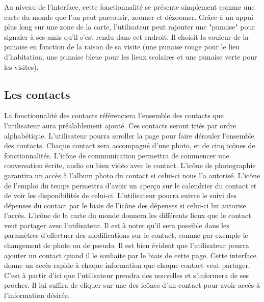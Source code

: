 \documentclass[11pt]{article}
\begin{document}
Au niveau de l'interface, cette fonctionnalité se présente simplement comme une carte du monde que l'on peut parcourir, zoomer et dézoomer. Grâce à un appui plus long sur une zone de la carte, l'utilisateur peut rajouter une "punaise" pour signaler à ses amis qu'il s'est rendu dans cet endroit. Il choisit la couleur de la punaise en fonction de la raison de sa visite (une punaise rouge pour le lieu d'habitation, une punaise bleue pour les lieux scolaires et une punaise verte pour les visites).
\subsection{Les contacts}\label{par:contact}
La fonctionnalité des contacts référenciera l’ensemble des contacts que l’utilisateur aura préalablement ajouté. Ces contacts seront triés par ordre alphabétique. L’utilisateur pourra scroller la page pour faire dérouler l’ensemble des contacts. Chaque contact sera accompagné d’une photo, et de cinq icônes de fonctionnalités. L'icône de communication permettra de commencer une conversation écrite, audio ou bien vidéo avec le contact. L’icône de photographie garantira un accès à l’album photo du contact si celui-ci nous l’a autorisé. L’icône de l’emploi du temps permettra d’avoir un aperçu sur le calendrier du contact et de voir les disponibilités de celui-ci. L’utilisateur pourra suivre le suivi des dépenses du contact par le biais de l’icône des dépenses si celui-ci lui autorise l’accès. L’icône de la carte du monde donnera les différents lieux que le contact veut partager avec l’utilisateur. Il est à noter qu’il sera possible dans les paramètres d’effectuer des modifications sur le contact, comme par exemple le changement de photo ou de pseudo. Il est bien évident que l'utilisateur pourra ajouter un contact quand il le souhaite par le biais de cette page.
Cette interface donne un accès rapide à chaque information que chaque contact veut partager. C’est à partir d’ici que l’utilisateur prendra des nouvelles et s’informera de ses proches. Il lui suffira de cliquer sur une des icônes d’un contact pour avoir accès à l’information désirée.
\end{document}
